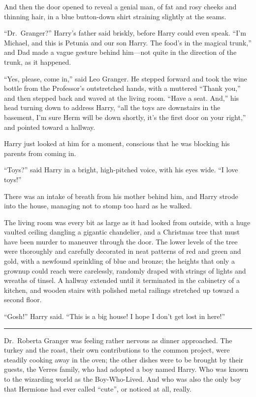 And then the door opened to reveal a genial man, of fat and rosy cheeks
and thinning hair, in a blue button-down shirt straining slightly at the
seams.

``Dr.~Granger?'' Harry's father said briskly, before Harry could even
speak. ``I'm Michael, and this is Petunia and our son Harry. The food's
in the magical trunk,'' and Dad made a vague gesture behind him---not
quite in the direction of the trunk, as it happened.

``Yes, please, come in,'' said Leo Granger. He stepped forward and took
the wine bottle from the Professor's outstretched hands, with a muttered
``Thank you,'' and then stepped back and waved at the living room.
``Have a seat. And,'' his head turning down to address Harry, ``all the
toys are downstairs in the basement, I'm sure Herm will be down shortly,
it's the first door on your right,'' and pointed toward a hallway.

Harry just looked at him for a moment, conscious that he was blocking
his parents from coming in.

``Toys?'' said Harry in a bright, high-pitched voice, with his eyes
wide. ``I love toys!''

There was an intake of breath from his mother behind him, and Harry
strode into the house, managing not to stomp too hard as he walked.

The living room was every bit as large as it had looked from outside,
with a huge vaulted ceiling dangling a gigantic chandelier, and a
Christmas tree that must have been murder to maneuver through the door.
The lower levels of the tree were thoroughly and carefully decorated in
neat patterns of red and green and gold, with a newfound sprinkling of
blue and bronze; the heights that only a grownup could reach were
carelessly, randomly draped with strings of lights and wreaths of
tinsel. A hallway extended until it terminated in the cabinetry of a
kitchen, and wooden stairs with polished metal railings stretched up
toward a second floor.

``Gosh!'' Harry said. ``This is a big house! I hope I don't get lost in
here!''

\begin{center}\rule{3in}{0.4pt}\end{center}

Dr.~Roberta Granger was feeling rather nervous as dinner approached. The
turkey and the roast, their own contributions to the common project,
were steadily cooking away in the oven; the other dishes were to be
brought by their guests, the Verres family, who had adopted a boy named
Harry. Who was known to the wizarding world as the Boy-Who-Lived. And
who was also the only boy that Hermione had ever called ``cute'', or
noticed at all, really.

